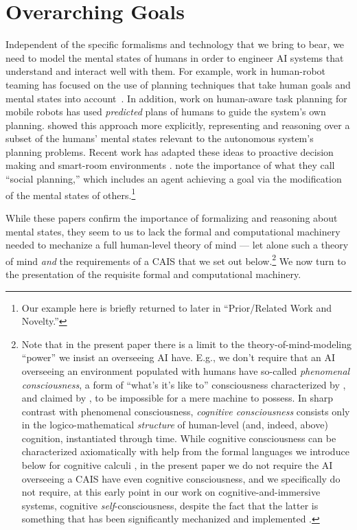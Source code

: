 \section{Overarching Goals}\label{ref:overarching_goals}

Independent of the specific formalisms and technology
that we bring to bear, we need to
model the mental states of humans in order to engineer AI
systems that understand and interact well with them.
For example, work in human-robot teaming has focused on
the use of planning techniques that take human goals and
mental states into account~\cite{briggs_multi-modal_2012}.
In addition, work on human-aware task planning for mobile robots
\cite{cirillo_human-aware_2009} has used \emph{predicted} plans of humans to
guide the system's own planning.
\cite{talamadupula_coordination_2014,chakraborti_planning_2015} showed this
approach more explicitly, representing and reasoning over a subset
of the humans' mental states relevant to the autonomous system's planning
problems.
Recent work has adapted these ideas to proactive decision making
\cite{sengupta_radar_2017,kim_towards_2017} and smart-room environments
\cite{chakraborti_mr._2017}.  \cite{pearce_etal_social_planning_aaai2014}
note the importance of what they call ``social planning,'' which
includes an agent achieving a goal via the modification of the mental
states of others.\footnote{Our example here is briefly returned
to later in ``Prior/Related Work and Novelty.''}

While these papers confirm the importance of formalizing and reasoning
about mental states, they seem to us to lack the formal and
computational machinery needed to mechanize a full human-level theory
of mind --- let alone such a theory of mind \emph{and} the
requirements of a CAIS that we set out below.\footnote{Note that in
  the present paper there is a limit to the theory-of-mind-modeling
  ``power'' we insist an overseeing AI have.  E.g., we don't require
  that an AI overseeing an environment populated with humans have
  so-called \textit{phenomenal consciousness}, a form of ``what's it's
  like to'' consciousness characterized by \cite{bbs.block}, and
  claimed by \cite{sb_billion_conscious_robot}, to be impossible for a
  mere machine to possess.  In sharp contrast with phenomenal
  consciousness, \textit{cognitive consciousness} consists only in the
  logico-mathematical \emph{structure} of human-level (and, indeed,
  above) cognition, instantiated through time.  While cognitive
  consciousness can be characterized axiomatically with help from the
  formal languages we introduce below for cognitive calculi
  \cite{axiomatizing_consciousness1}, in the present paper we do not
  require the AI overseeing a CAIS have even cognitive consciousness,
  and we specifically do not require, at this early point in our work
  on cognitive-and-immersive systems, cognitive
  \emph{self}-consciousness, despite the fact that the latter is
  something that has been significantly mechanized and implemented
  \cite{roman2015_robot_self-con,sb_on_knowledge_game}.}  We now turn
to the presentation of the requisite formal and computational
machinery.
